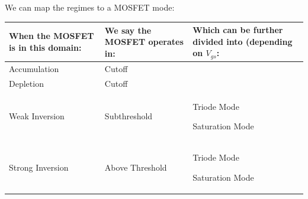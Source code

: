 \documentclass[main]{subfiles}
\begin{document}
We can map the regimes to a MOSFET mode:


\begin{longtable}{ |p{4cm}|p{4cm}|p{4cm}| }
\hline
\textbf{When the MOSFET is in this domain:} & \textbf{We say the MOSFET operates in:} & \textbf{Which can be further divided into (depending on $V_{gs}$:} \\ \hline
\endhead
Accumulation & Cutoff & \\ \hline
Depletion & Cutoff & \\ \hline

Weak Inversion & Subthreshold & Triode Mode \par Saturation Mode\\ \hline
 Strong Inversion & Above Threshold & Triode Mode \par Saturation Mode\\ \hline
\end{longtable}
\end{document}
